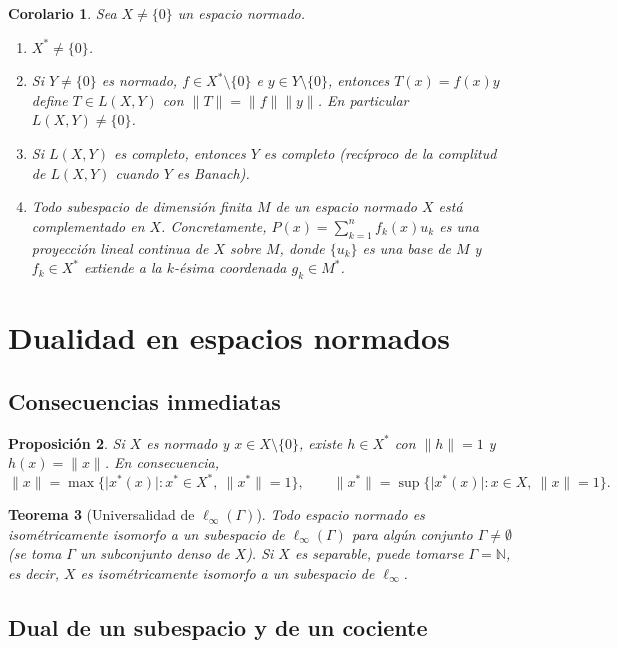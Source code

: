 \documentclass[11pt,a4paper]{article}
\newcommand{\N}{\mathbb{N}}
\newcommand{\norm}[1]{\lVert #1\rVert}
\newcommand{\abs}[1]{\lvert #1\rvert}
\theoremstyle{plain}
\newtheorem{teorema}{Teorema}[section]
\newtheorem{proposicion}[teorema]{Proposición}
\newtheorem{corolario}[teorema]{Corolario}
\theoremstyle{definition}
\theoremstyle{remark}
\begin{document}
\begin{corolario}
Sea $X\neq\{0\}$ un espacio normado.
\begin{enumerate}[label=(\alph*)]
\item $X^*\neq\{0\}$.
\item Si $Y\neq\{0\}$ es normado, $f\in X^*\setminus\{0\}$ e $y\in Y\setminus\{0\}$, entonces $T(x)=f(x)y$ define $T\in L(X,Y)$ con $\norm T=\norm f\norm y$. En particular $L(X,Y)\neq\{0\}$.
\item Si $L(X,Y)$ es completo, entonces $Y$ es completo (recíproco de la complitud de $L(X,Y)$ cuando $Y$ es Banach).
\item Todo subespacio de dimensión finita $M$ de un espacio normado $X$ está complementado en $X$. Concretamente, $P(x)=\sum_{k=1}^n f_k(x)u_k$ es una proyección lineal continua de $X$ sobre $M$, donde $\{u_k\}$ es una base de $M$ y $f_k\in X^*$ extiende a la $k$-ésima coordenada $g_k\in M^*$.
\end{enumerate}
\end{corolario}

\section{Dualidad en espacios normados}

\subsection{Consecuencias inmediatas}

\begin{proposicion}
Si $X$ es normado y $x\in X\setminus\{0\}$, existe $h\in X^*$ con $\norm h=1$ y $h(x)=\norm x$. En consecuencia,
\[
\norm x=\max\{\abs{x^*(x)}: x^*\in X^*,\ \norm{x^*}=1\},\qquad
\norm{x^*}=\sup\{\abs{x^*(x)}:x\in X,\ \norm x=1\}.
\]
\end{proposicion}

\begin{teorema}[Universalidad de $\ell_\infty(\Gamma)$]
Todo espacio normado es isométricamente isomorfo a un subespacio de $\ell_\infty(\Gamma)$ para algún conjunto $\Gamma\neq\emptyset$ (se toma $\Gamma$ un subconjunto denso de $X$). Si $X$ es separable, puede tomarse $\Gamma=\N$, es decir, $X$ es isométricamente isomorfo a un subespacio de $\ell_\infty$.
\end{teorema}

\subsection{Dual de un subespacio y de un cociente}
\end{document}
